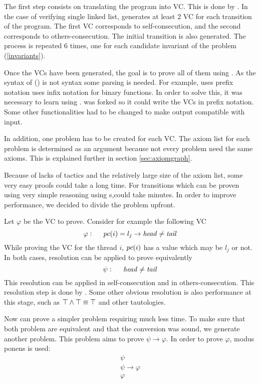 The first step consists on translating the program into \gls{VC}. 
%
This is done by \leap. 
%
In the case of verifying single linked list, \leap generates at least 2 \gls{VC} for each transition of the program. 
%
The first \gls{VC} corresponds to self-consecution, and the second corresponds to others-consecution.
%
The initial transition is also generated.
%
The process is repeated 6 times, one for each candidate invariant of the problem (\ref{invariants}).

Once the \gls{VC}s have been generated, the goal is to prove all of them using \spass. 
%
As the syntax of \spass (\cite{spasssyntax}) is not \leap syntax some parsing is needed. 
%
For example, \spass uses prefix notation  \leap uses infix notation for binary functions.
%
In order to solve this, it was necessary to learn \ocaml using \cite{ocamlbook}.
%
\leap was forked so it could write the \gls{VC}s in prefix notation.
%
Some other \leap functionalities had to be changed to make \leap output compatible with \spass input.

In addition, one \spass problem has to be created for each \gls{VC}. 
%
The axiom list for each problem is determined as an argument because not every \spass problem need the same axioms. 
%
This is explained further in section \ref{sec:axiomgraph}.

Because of \spass lacks of tactics and the relatively large size of the axiom list, some very easy proofs could take a long time.
%
For transitions which can be proven using very simple reasoning using \pc s,\spass could take minutes. 
%
In order to improve \spass performance, we decided to divide the problem upfront.

Let $\varphi$ be the \gls{VC} to prove. Consider for example the following \gls{VC}
	\[
		\varphi : \;\;\;\;\; pc(i) = l_j \to \mathit{head} \not = \mathit{tail}
	\]
While proving the \gls{VC} for the thread $i$, $pc(i)$ has a value which may be $l_j$ or not. 
%
In both cases, resolution can be applied to prove equivalently
	\[
		\psi : \;\;\;\;\; \mathit{head} \not = \mathit{tail}
	\]
This resolution can be applied in self-consecution and in others-consecution. 
%
This resolution step is done by \gandalf. 
%
Some other obvious resolution is also performance at this stage, such as $\top \wedge \top \equiv \top$ and other tautologies.

Now \spass can prove a simpler problem requiring much less time.
%
To make sure that both problem are equivalent and that the conversion was sound, we generate another \spass problem. 
%
This \spass problem aims to prove $\psi \to \varphi$.
%
In order to prove $\varphi$, modus ponens is used:
\[
	\begin{array}{l}
		\psi\\
		\psi \to \varphi\\\hline
		\varphi
	\end{array}
\]

